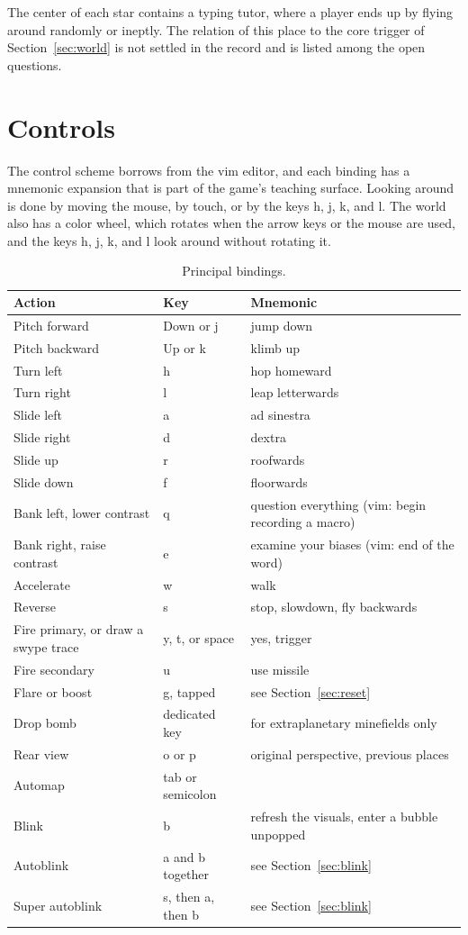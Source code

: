 \documentclass[11pt]{article}
\begin{document}
The center of each star contains a typing tutor, where a player ends up by flying around randomly or ineptly. The relation of this place to the core trigger of Section~\ref{sec:world} is not settled in the record and is listed among the open questions.

\section{Controls}
\label{sec:controls}

The control scheme borrows from the vim editor, and each binding has a mnemonic expansion that is part of the game's teaching surface. Looking around is done by moving the mouse, by touch, or by the keys h, j, k, and l. The world also has a color wheel, which rotates when the arrow keys or the mouse are used, and the keys h, j, k, and l look around without rotating it.

\begin{table}[h]
\centering
\begin{tabular}{@{}p{3.3cm}p{2.6cm}p{6.3cm}@{}}
\toprule
Action & Key & Mnemonic \\
\midrule
Pitch forward & Down or j & jump down \\
Pitch backward & Up or k & klimb up \\
Turn left & h & hop homeward \\
Turn right & l & leap letterwards \\
Slide left & a & ad sinestra \\
Slide right & d & dextra \\
Slide up & r & roofwards \\
Slide down & f & floorwards \\
Bank left, lower contrast & q & question everything (vim: begin recording a macro) \\
Bank right, raise contrast & e & examine your biases (vim: end of the word) \\
Accelerate & w & walk \\
Reverse & s & stop, slowdown, fly backwards \\
Fire primary, or draw a swype trace & y, t, or space & yes, trigger \\
Fire secondary & u & use missile \\
Flare or boost & g, tapped & see Section~\ref{sec:reset} \\
Drop bomb & dedicated key & for extraplanetary minefields only \\
Rear view & o or p & original perspective, previous places \\
Automap & tab or semicolon & \\
Blink & b & refresh the visuals, enter a bubble unpopped \\
Autoblink & a and b together & see Section~\ref{sec:blink} \\
Super autoblink & s, then a, then b & see Section~\ref{sec:blink} \\
\bottomrule
\end{tabular}
\caption{Principal bindings.}
\end{table}
\end{document}
